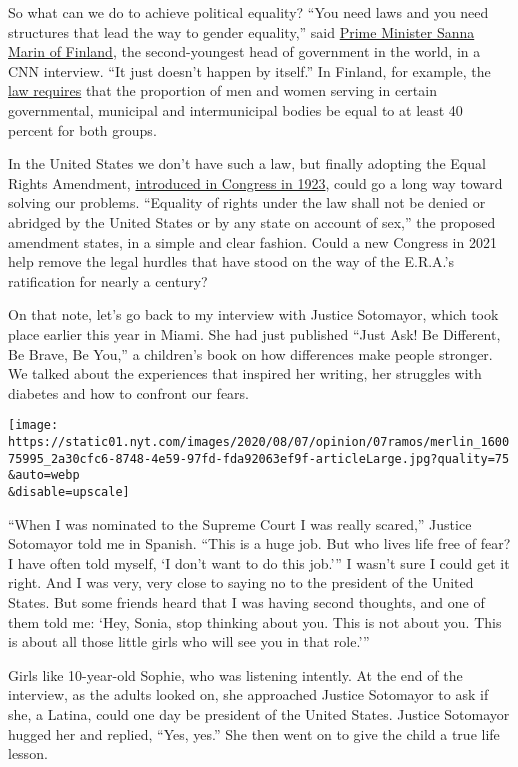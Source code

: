 So what can we do to achieve political equality? ``You need laws and you
need structures that lead the way to gender equality,'' said
\href{https://www.cnn.com/videos/tv/2020/02/07/exp-gps-0209-marin-on-gender-equality-in-usa.cnn}{Prime
Minister Sanna Marin of Finland}, the second-youngest head of government
in the world, in a CNN interview. ``It just doesn't happen by itself.''
In Finland, for example, the
\href{https://thl.fi/en/web/gender-equality/gender-equality-in-finland/decision-making/gender-quotas}{law
requires} that the proportion of men and women serving in certain
governmental, municipal and intermunicipal bodies be equal to at least
40 percent for both groups.

In the United States we don't have such a law, but finally adopting the
Equal Rights Amendment,
\href{https://thewatchdogonline.com/the-equal-rights-amendment-is-almost-there-29291}{introduced
in Congress in 1923}, could go a long way toward solving our problems.
``Equality of rights under the law shall not be denied or abridged by
the United States or by any state on account of sex,'' the proposed
amendment states, in a simple and clear fashion. Could a new Congress in
2021 help remove the legal hurdles that have stood on the way of the
E.R.A.'s ratification for nearly a century?

On that note, let's go back to my interview with Justice Sotomayor,
which took place earlier this year in Miami. She had just published
``Just Ask! Be Different, Be Brave, Be You,'' a children's book on how
differences make people stronger. We talked about the experiences that
inspired her writing, her struggles with diabetes and how to confront
our fears.

\texttt{[image: https://static01.nyt.com/images/2020/08/07/opinion/07ramos/merlin\_160075995\_2a30cfc6-8748-4e59-97fd-fda92063ef9f-articleLarge.jpg?quality=75\\\&auto=webp\\\&disable=upscale]}

``When I was nominated to the Supreme Court I was really scared,''
Justice Sotomayor told me in Spanish. ``This is a huge job. But who
lives life free of fear? I have often told myself, `I don't want to do
this job.''' I wasn't sure I could get it right. And I was very, very
close to saying no to the president of the United States. But some
friends heard that I was having second thoughts, and one of them told
me: `Hey, Sonia, stop thinking about you. This is not about you. This is
about all those little girls who will see you in that role.'''

Girls like 10-year-old Sophie, who was listening intently. At the end of
the interview, as the adults looked on, she approached Justice Sotomayor
to ask if she, a Latina, could one day be president of the United
States. Justice Sotomayor hugged her and replied, ``Yes, yes.'' She then
went on to give the child a true life lesson.

